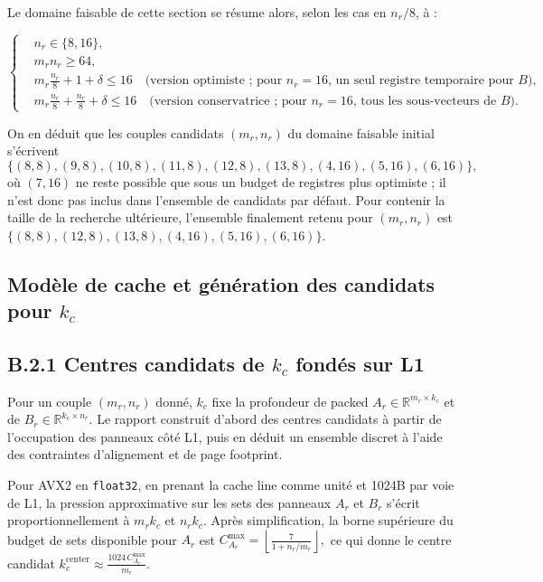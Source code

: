 \documentclass[a4paper,11pt,oneside]{article}
\begin{document}
Le domaine faisable de cette section se résume alors, selon les cas en $n_r/8$, à :

$$
\left\{
\begin{aligned}
&n_r \in \{8,16\},\\
&m_r n_r \ge 64,\\
&m_r \frac{n_r}{8} + 1 + \delta \le 16 \quad \text{(version optimiste ; pour } n_r=16 \text{, un seul registre temporaire pour } B\text{)},\\
&m_r \frac{n_r}{8} + \frac{n_r}{8} + \delta \le 16 \quad \text{(version conservatrice ; pour } n_r=16 \text{, tous les sous-vecteurs de } B\text{)}.
\end{aligned}
\right.
$$

On en déduit que les couples candidats $(m_r,n_r)$ du domaine faisable initial s'écrivent
$$
\{(8,8),(9,8),(10,8),(11,8),(12,8),(13,8),(4,16),(5,16),(6,16)\},
$$
où $(7,16)$ ne reste possible que sous un budget de registres plus optimiste ; il n'est donc pas inclus dans l'ensemble de candidats par défaut. Pour contenir la taille de la recherche ultérieure, l'ensemble finalement retenu pour $(m_r,n_r)$ est
$
\{(8,8),(12,8),(13,8),(4,16),(5,16),(6,16)\}.
$

\subsection{Modèle de cache et génération des candidats pour $k_c$}

\subsection*{B.2.1 Centres candidats de $k_c$ fondés sur L1}

Pour un couple $(m_r,n_r)$ donné, $k_c$ fixe la profondeur de packed $A_r \in \mathbb{R}^{m_r \times k_c}$ et de $B_r \in \mathbb{R}^{k_c \times n_r}$. Le rapport construit d'abord des centres candidats à partir de l'occupation des panneaux côté L1, puis en déduit un ensemble discret à l'aide des contraintes d'alignement et de page footprint.

Pour AVX2 en \texttt{float32}, en prenant la cache line comme unité et 1024B par voie de L1, la pression approximative sur les sets des panneaux $A_r$ et $B_r$ s'écrit proportionnellement à $m_r k_c$ et $n_r k_c$. Après simplification, la borne supérieure du budget de sets disponible pour $A_r$ est
$
C_{A_r}^{\max}=\left\lfloor \frac{7}{1+n_r/m_r} \right\rfloor,
$
ce qui donne le centre candidat
$
k_c^{\text{center}} \approx \frac{1024\,C_{A_r}^{\max}}{m_r}.
$
\end{document}
